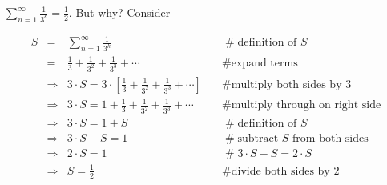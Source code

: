 \documentclass[11pt, oneside]{article}   	%
\begin{document}
 $\sum\limits_{n = 1}^\infty   \frac{1}{3^k}  = \frac{1}{2}$. But why? Consider 
      
\begin{equation*}
\begin{array}{lllll}
S
&=&   \sum\limits_{n = 1}^\infty   \frac{1}{3^k}                                                                     &\quad  \mathrel{\#} \text{definition of $S$}                    \\ 
&=& \frac{1}{3} + \frac{1}{3^2} + \frac{1}{3^3} + \cdots                                                       &\quad  \mathrel{\#} \text{expand terms}                         \\
&\Rightarrow& 3 \cdot S = 3 \cdot [\frac{1}{3} + \frac{1}{3^2} + \frac{1}{3^3} + \cdots ]      &\quad  \mathrel{\#} \text{multiply both sides by 3}         \\
&\Rightarrow& 3 \cdot S = 1 + \frac{1}{3} + \frac{1}{3^2} + \frac{1}{3^3} + \cdots               &\quad  \mathrel{\#} \text{multiply through on right side} \\
&\Rightarrow& 3 \cdot S = 1 + S                                                                                         &\quad  \mathrel{\#} \text{definition of $S$}                      \\
&\Rightarrow& 3 \cdot S - S = 1                                                                                          &\quad  \mathrel{\#} \text{subtract $S$ from both sides}  \\
&\Rightarrow& 2 \cdot S  = 1                                                                                               &\quad  \mathrel{\#} 3 \cdot S - S = 2 \cdot S                   \\
&\Rightarrow& S  = \frac{1}{2}                                                                                             &\quad  \mathrel{\#} \text{divide both sides by 2} 
\end{array}
\end{equation*}
\end{document}
